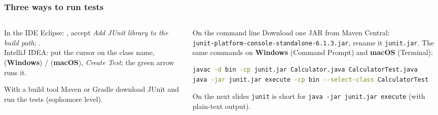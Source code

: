 \documentclass[aspectratio=169,10pt,compress]{beamer}
\newcommand{\win}{\textbf{Windows}}
\newcommand{\mac}{\textbf{macOS}}
\begin{document}




\begin{frame}[t,fragile] \frametitle{Three ways to run tests}
  \begin{columns}[T]
    \begin{column}{0.48\textwidth}
      \begin{block}{In the IDE}
        \small
        Eclipse: , accept \emph{Add JUnit library to the build path};
        .\\
        IntelliJ IDEA: put the cursor on the class name,  (\win) /  (\mac),
        \emph{Create Test}; the green arrow runs it.
      \end{block}
      \begin{block}{With a build tool}
        \small Maven or Gradle download JUnit and run the tests (sophomore level).
      \end{block}
    \end{column}
    \begin{column}{0.48\textwidth}
      \begin{block}{On the command line}
        \small Download one JAR from Maven Central:\\
        \texttt{junit-platform-console-standalone-6.1.3.jar}, rename it \texttt{junit.jar}.
        The same commands on \win{} (Command Prompt) and \mac{} (Terminal):
      \end{block}


\begin{lstlisting}[style=codesnippet, language=bash, basicstyle=\ttfamily\tiny]
javac -d bin -cp junit.jar Calculator.java CalculatorTest.java
java -jar junit.jar execute -cp bin --select-class CalculatorTest
\end{lstlisting}


      \small On the next slides \texttt{junit} is short for \texttt{java -jar junit.jar execute} (with plain-text output).
    \end{column}
  \end{columns}
\end{frame}
\end{document}
